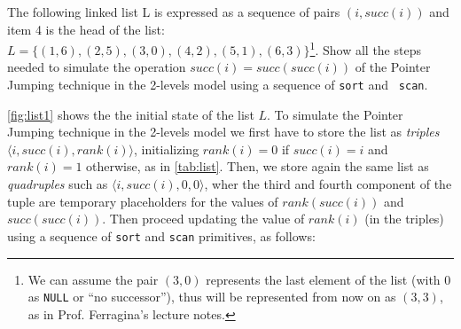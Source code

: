 \exercise

The following linked list L is expressed as a sequence of pairs $(i, succ(i))$
and item 4 is the head of the list: $L = \{ (1,6), (2,5), (3,0), (4,2), (5,1),
(6,3) \}$\footnote{We can assume the pair $(3, 0)$ represents the last element
of the list (with 0 as {\tt NULL} or ``no successor''), thus will be represented
from now on as $(3, 3)$, as in Prof. Ferragina's lecture notes.}. Show all the
steps needed to simulate the operation $succ(i) = succ(succ(i))$ of the Pointer
Jumping technique in the 2-levels model using a sequence of {\tt sort} and {\tt
scan}.

\solution

\autoref{fig:list1} shows the the initial state of the list $L$. To simulate the
Pointer Jumping technique in the 2-levels model we first have to store the list
as \emph{triples} $\langle i, succ(i), rank(i) \rangle$, initializing $rank(i) =
0$ if $succ(i) = i$ and $rank(i) = 1$ otherwise, as in \autoref{tab:list}. Then,
we store again the same list as \emph{quadruples} such as $\langle i, succ(i),
0, 0 \rangle$, wher the third and fourth component of the tuple are temporary
placeholders for the values of $rank(succ(i))$ and $succ(succ(i))$. Then proceed
updating the value of $rank(i)$ (in the triples) using a sequence of {\tt sort}
and {\tt scan} primitives, as follows:
%
